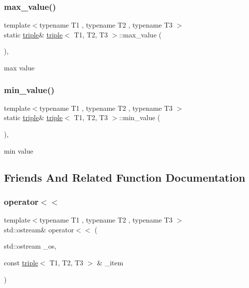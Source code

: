 \subsubsection{\texorpdfstring{max\+\_\+value()}{max\_value()}}
{\footnotesize\ttfamily template$<$typename T1 , typename T2 , typename T3 $>$ \\
static \hyperlink{structtriple}{triple}\& \hyperlink{structtriple}{triple}$<$ T1, T2, T3 $>$\+::max\+\_\+value (\begin{DoxyParamCaption}{ }\end{DoxyParamCaption})\hspace{0.3cm}{\ttfamily [inline]}, {\ttfamily [static]}}



max value 

\mbox{\label{structtriple_a91d8338063226b63eea74e56377a162b}} 
\subsubsection{\texorpdfstring{min\+\_\+value()}{min\_value()}}
{\footnotesize\ttfamily template$<$typename T1 , typename T2 , typename T3 $>$ \\
static \hyperlink{structtriple}{triple}\& \hyperlink{structtriple}{triple}$<$ T1, T2, T3 $>$\+::min\+\_\+value (\begin{DoxyParamCaption}{ }\end{DoxyParamCaption})\hspace{0.3cm}{\ttfamily [inline]}, {\ttfamily [static]}}



min value 



\subsection{Friends And Related Function Documentation}
\mbox{\label{structtriple_a213e2d21647f20d6287690438970f212}} 
\subsubsection{\texorpdfstring{operator$<$$<$}{operator<<}}
{\footnotesize\ttfamily template$<$typename T1 , typename T2 , typename T3 $>$ \\
std\+::ostream\& operator$<$$<$ (\begin{DoxyParamCaption}\item[{std\+::ostream}]{\+\_\+os,  }\item[{const \hyperlink{structtriple}{triple}$<$ T1, T2, T3 $>$ \&}]{\+\_\+item }\end{DoxyParamCaption})\hspace{0.3cm}{\ttfamily [friend]}}




